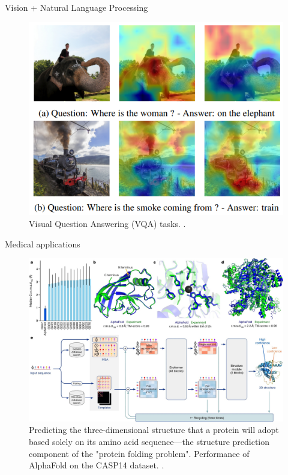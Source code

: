 \documentclass[xcolor={usenames,dvipsnames},handout]{beamer}
\begin{document}
\begin{frame}{Vision + Natural Language Processing}
\begin{figure}
\includegraphics[width=0.7\linewidth]{Mutan}
\caption{Visual Question Answering (VQA) tasks. {\tiny \href{https://arxiv.org/pdf/1705.06676.pdf}{}}.}
\end{figure}
\end{frame}

\begin{frame}{Medical applications}
\begin{figure}
\includegraphics[width=0.9\linewidth]{alphafold}
\caption{Predicting the three-dimensional structure that a protein will adopt based solely on its amino acid sequence—the structure prediction component of the "protein folding problem". Performance of AlphaFold on the CASP14 dataset. {\tiny \href{https://www.nature.com/articles/s41586-021-03819-2}{}}.}
\end{figure}
\end{frame}
\end{document}

